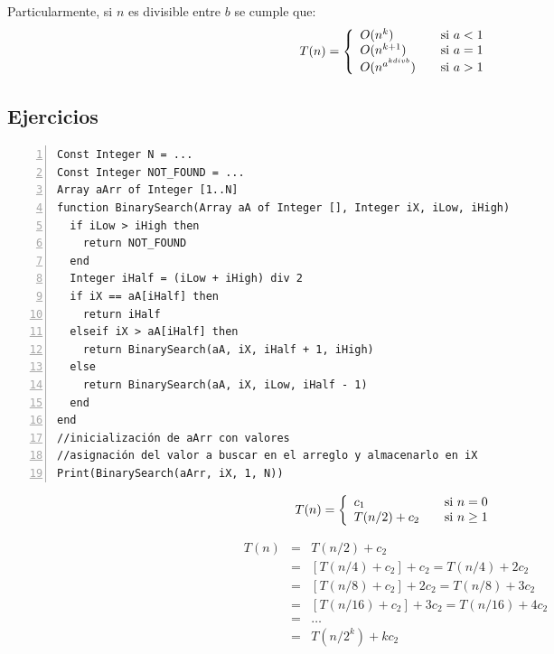 Particularmente, si $n$ es divisible entre $b$ se cumple que:
\begin{equation}
T(n) = \left\{
  \begin{array}{l l}
    O(n^{k}) & \quad \text{si $a < 1$}\\
    O(n^{k+1}) & \quad \text{si $a = 1$}\\
    O(n^{a^{k div b}}) & \quad \text{si $a > 1$}
  \end{array} \right.
\end{equation}

\subsection{Ejercicios}

\begin{lstlisting}[upquote=true, language=pseudo, numbers=left]
Const Integer N = ...
Const Integer NOT_FOUND = ...
Array aArr of Integer [1..N]
function BinarySearch(Array aA of Integer [], Integer iX, iLow, iHigh)
  if iLow > iHigh then
    return NOT_FOUND
  end
  Integer iHalf = (iLow + iHigh) div 2
  if iX == aA[iHalf] then
    return iHalf
  elseif iX > aA[iHalf] then
    return BinarySearch(aA, iX, iHalf + 1, iHigh)
  else
    return BinarySearch(aA, iX, iLow, iHalf - 1)
  end
end
//inicialización de aArr con valores
//asignación del valor a buscar en el arreglo y almacenarlo en iX
Print(BinarySearch(aArr, iX, 1, N))
\end{lstlisting}

\begin{equation}
T(n) = \left\{
  \begin{array}{l l}
    c_1 & \quad \text{si $n = 0$}\\
    T(n/2) + c_2& \quad \text{si $n \ge 1$}
  \end{array} \right.
\end{equation}

\begin{eqnarray*}
T(n)&=&T(n/2) + c_2\\
&=&\left [ T(n/4) + c_2\right ] + c_2 = T(n/4) + 2c_2\\
&=&\left [ T(n/8) + c_2\right ] + 2c_2 = T(n/8) + 3c_2\\
&=&\left [ T(n/16) + c_2\right ] + 3c_2 = T(n/16) + 4c_2\\
&=&\dots\\
&=&T(n/2^k) + kc_2\\
\end{eqnarray*}

